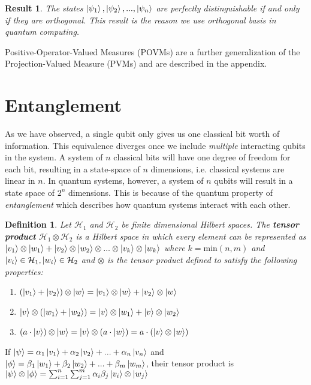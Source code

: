 \documentclass[12pt,twoside]{report}
\theoremstyle{thmstyle}
\newtheorem{defn}[subsection]{Definition}
\newtheorem{result}[subsection]{Result}
\begin{document}
\begin{result}
            The states $\ket{\psi_1}, \ket{\psi_2}, ..., \ket{\psi_n}$ are perfectly distinguishable if and only if they are orthogonal. This result is the reason we use orthogonal basis in quantum computing.
\end{result}

Positive-Operator-Valued Measures (POVMs) are a further generalization of the Projection-Valued Measure (PVMs) and are described in the appendix. 

\section{Entanglement}
As we have observed, a single qubit only gives us one classical bit worth of information. This equivalence diverges once we include \textit{multiple} interacting qubits in the system. A system of $n$ classical bits will have one degree of freedom for each bit, resulting in a state-space of $n$ dimensions, i.e. classical systems are linear in $n$. In quantum systems, however, a system of $n$ qubits will result in a state space of $2^n$ dimensions. This is because of the quantum property of \textit{entanglement} which describes how quantum systems interact with each other.

\begin{defn}
    Let $\mathcal{H}_1$ and $\mathcal{H}_2$ be finite dimensional Hilbert spaces.
    The \textbf{tensor product} $\mathcal{H}_1 \otimes \mathcal{H}_2$ is a Hilbert space in which every element can be represented as $\ket{v_1} \otimes \ket{w_1} + \ket{v_2} \otimes \ket{w_2} \otimes ... \otimes \ket{v_k} \otimes \ket{w_k}$ where $k = \text{min}(n,m)$ and $\ket{v_i} \in \mathcal{H}_1, \ket{w_i} \in \mathcal{H}_2$ and $\otimes$ is the tensor product defined to satisfy the following properties:
    \begin{enumerate}
        \item $(\ket{v_1} + \ket{v_2}) \otimes \ket{w} = \ket{v_1} \otimes \ket{w} + \ket{v_2} \otimes \ket{w}$
        \item $\ket{v} \otimes (\ket{w_1} + \ket{w_2}) = \ket{v} \otimes \ket{w_1} + \ket{v} \otimes \ket{w_2}$
        \item $(a \cdot \ket{v}) \otimes \ket{w} = \ket{v} \otimes (a \cdot \ket{w}) = a \cdot (\ket{v} \otimes \ket{w})$
    \end{enumerate}
\end{defn}

If $\ket{\psi} = \alpha_1 \ket{v_1} + \alpha_2 \ket{v_2} + ... + \alpha_n \ket{v_n}$ and $\ket{\phi} = \beta_1 \ket{w_1} + \beta_2 \ket{w_2} + ... + \beta_m \ket{w_m}$, their tensor product is $\ket{\psi} \otimes \ket{\phi} = \sum_{i=1}^n \sum_{j=1}^m \alpha_i \beta_j \ket{v_i} \otimes \ket{w_j}$
\end{document}
